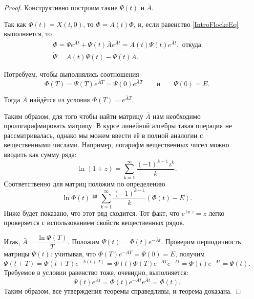 \begin{proof}
  Конструктивно построим такие $\Psi(t)$ и $\bar{A}$.

  Так как $\Phi(t) = X(t, 0)$,
  то $\dot{\Phi} = A(t) \Phi$,
  и, если равенство \eqref{IntroFlockeEq} выполняется, то
  \begin{gather*}
	  \dot{\Phi} = \dot{\Psi} e^{\bar{A} t} +
	    \Psi(t) \bar{A} e^{\bar{A} t} =
	    A(t) \Psi(t) e^{\bar{A} t},\text{ откуда}\\
	  \dot{\Psi} = A(t) \Psi(t) - \Psi(t) \bar{A}.
  \end{gather*}
  
  Потребуем, чтобы выполнялись соотношения
  \begin{equation*}
    \Phi(T) = \Psi(T) e^{\bar{A} T} = \Psi(0) e^{\bar{A}T}\qquad
      \text{и} \qquad
    \Psi(0) = E.
  \end{equation*}

  Тогда $\bar{A}$ найдётся из условия
  $\Phi(T) = e^{\bar{A} T}$.

  Таким образом, для того чтобы найти
  матрицу $\bar{A}$ нам необходимо
  \glqq прологарифмировать\grqq{} матрицу.
  В курсе линейной алгебры такая операция не рассматривалась,
  однако мы можем ввести её в полной аналогии с вещественными числами.
  Например, логарифм вещественных чисел можно вводить как сумму ряда:
  \begin{equation*}
    \ln(1+z) = \sum_{k=1}^\infty \dfrac{(-1)^{k-1} z^k}{k}.
  \end{equation*}
  Соответственно для матриц положим по определению
  \begin{equation*}
	  \ln \Phi(t) \eqdef \sum_{k=1}^\infty \dfrac{(-1)^{k-1}}{k} (\Phi(t) - E).
  \end{equation*}
  Ниже будет показано, что этот ряд сходится.
  Тот факт, что $e^{\ln z} = z$ легко проверяется
  с использованием свойств вещественных рядов.

  Итак, $\bar{A} = \dfrac{\ln{\Phi(T)}}{T}$.
  Положим $\Psi(t) = \Phi(t) e^{-\bar{A}t}$.
  Проверим периодичность матрицы $\Psi(t)$:
  учитывая, что $\Phi(T)e^{-\bar{A}T} = \Psi(0) = E$, получим
  \begin{equation*}
	  \Psi(t+T) =
	    \Phi(t+T) e^{-\bar{A} (t+T)} =
	    \Phi(t) \Phi(T) e^{-\bar{A}T} e^{-\bar{A}t} =
	    \Phi(t) e^{-\bar{A}t} = \Psi(t).
  \end{equation*}
  Требуемое в условии равенство тоже, очевидно, выполняется:
  \begin{equation*}
	  \Psi(t) e^{\bar{A}t} = \Phi(t)e^{-\bar{A}t}e^{\bar{A}t} = \Phi(t).
  \end{equation*}
  Таким образом, все утверждения теоремы справедливы, и теорема доказана.
\end{proof}


